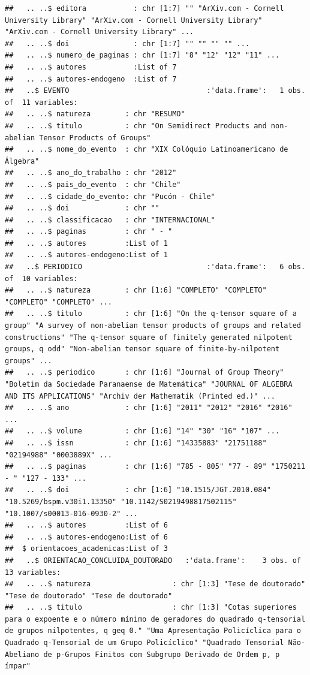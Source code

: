 \documentclass[]{article}
\begin{document}
\begin{verbatim}
##   .. ..$ editora           : chr [1:7] "" "ArXiv.com - Cornell University Library" "ArXiv.com - Cornell University Library" "ArXiv.com - Cornell University Library" ...
##   .. ..$ doi               : chr [1:7] "" "" "" "" ...
##   .. ..$ numero_de_paginas : chr [1:7] "8" "12" "12" "11" ...
##   .. ..$ autores           :List of 7
##   .. ..$ autores-endogeno  :List of 7
##   ..$ EVENTO                                :'data.frame':   1 obs. of  11 variables:
##   .. ..$ natureza        : chr "RESUMO"
##   .. ..$ titulo          : chr "On Semidirect Products and non-abelian Tensor Products of Groups"
##   .. ..$ nome_do_evento  : chr "XIX Colóquio Latinoamericano de Álgebra"
##   .. ..$ ano_do_trabalho : chr "2012"
##   .. ..$ pais_do_evento  : chr "Chile"
##   .. ..$ cidade_do_evento: chr "Pucón - Chile"
##   .. ..$ doi             : chr ""
##   .. ..$ classificacao   : chr "INTERNACIONAL"
##   .. ..$ paginas         : chr " - "
##   .. ..$ autores         :List of 1
##   .. ..$ autores-endogeno:List of 1
##   ..$ PERIODICO                             :'data.frame':   6 obs. of  10 variables:
##   .. ..$ natureza        : chr [1:6] "COMPLETO" "COMPLETO" "COMPLETO" "COMPLETO" ...
##   .. ..$ titulo          : chr [1:6] "On the q-tensor square of a group" "A survey of non-abelian tensor products of groups and related constructions" "The q-tensor square of finitely generated nilpotent groups, q odd" "Non-abelian tensor square of finite-by-nilpotent groups" ...
##   .. ..$ periodico       : chr [1:6] "Journal of Group Theory" "Boletim da Sociedade Paranaense de Matemática" "JOURNAL OF ALGEBRA AND ITS APPLICATIONS" "Archiv der Mathematik (Printed ed.)" ...
##   .. ..$ ano             : chr [1:6] "2011" "2012" "2016" "2016" ...
##   .. ..$ volume          : chr [1:6] "14" "30" "16" "107" ...
##   .. ..$ issn            : chr [1:6] "14335883" "21751188" "02194988" "0003889X" ...
##   .. ..$ paginas         : chr [1:6] "785 - 805" "77 - 89" "1750211 - " "127 - 133" ...
##   .. ..$ doi             : chr [1:6] "10.1515/JGT.2010.084" "10.5269/bspm.v30i1.13350" "10.1142/S0219498817502115" "10.1007/s00013-016-0930-2" ...
##   .. ..$ autores         :List of 6
##   .. ..$ autores-endogeno:List of 6
##  $ orientacoes_academicas:List of 3
##   ..$ ORIENTACAO_CONCLUIDA_DOUTORADO   :'data.frame':    3 obs. of  13 variables:
##   .. ..$ natureza                   : chr [1:3] "Tese de doutorado" "Tese de doutorado" "Tese de doutorado"
##   .. ..$ titulo                     : chr [1:3] "Cotas superiores para o expoente e o número mínimo de geradores do quadrado q-tensorial de grupos nilpotentes, q geq 0." "Uma Apresentação Policíclica para o Quadrado q-Tensorial de um Grupo Policíclico" "Quadrado Tensorial Não-Abeliano de p-Grupos Finitos com Subgrupo Derivado de Ordem p, p ímpar"

\end{verbatim}
\end{document}
